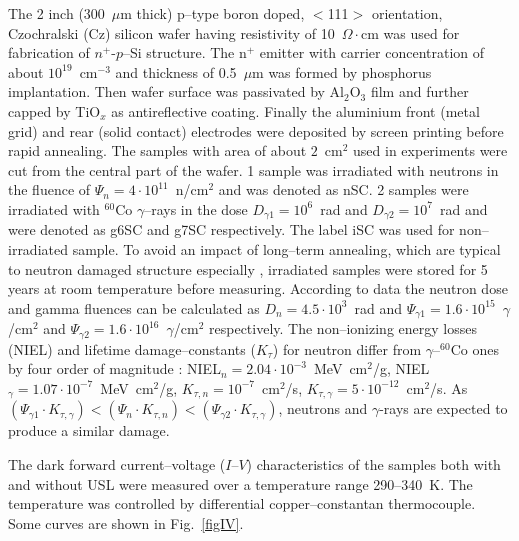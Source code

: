 \documentclass[aip,jap, amsmath,amssymb,reprint]{revtex4-1}
\begin{document}
The 2 inch (300~$\mu$m thick) p--type boron doped, $<$111$>$ orientation, Czochralski (Cz) silicon wafer having resistivity of 10~$\Omega\cdot$cm was used for fabrication of  $n^+$-$p$--Si structure.
The n$^+$ emitter with carrier concentration of about $10^{19}$~cm$^{-3}$ and thickness of 0.5~$\mu$m was formed by phosphorus implantation.
Then wafer surface was passivated by Al$_2$O$_3$ film and further capped by TiO$_x$ as antireflective coating.
Finally the aluminium front (metal grid) and rear (solid contact) electrodes were deposited by screen printing before rapid annealing.
The samples with area of about $2$~cm$^{2}$ used in experiments were cut from the central part of the wafer.
1 sample  was  irradiated  with  neutrons  in  the fluence  of $\Psi_n=4\cdot10^{11}$~n/cm$^2$  and was denoted as nSC.
2 samples were irradiated  with  $^{60}$Co $\gamma$--rays in the  dose  $D_{\gamma1}=10^6$~rad and $D_{\gamma2}=10^7$~rad and were denoted as g6SC and g7SC respectively.
The label iSC was used for non--irradiated sample.
To avoid an impact of  long--term annealing, which are typical to neutron damaged structure especially \cite{NIEL:Moll,Rew:Srour}, irradiated samples were stored  for  5 years  at  room  temperature before measuring.
According to data \cite{NIEL:Akkerman,Brauning} the neutron dose and gamma fluences can be calculated as $D_n=4.5\cdot10^3$~rad and $\Psi_{\gamma1}=1.6\cdot10^{15}$~$\gamma$/cm$^2$ and $\Psi_{\gamma2}=1.6\cdot10^{16}$~$\gamma$/cm$^2$ respectively.
The non--ionizing energy losses (NIEL) and lifetime damage--constants ($K_\tau$) for neutron
differ from $\gamma$--$^{60}$Co ones by four order of magnitude \cite{NIEL:Akkerman,NIEL:Jafari}:
NIEL$_n=2.04\cdot10^{-3}$~MeV~cm$^2$/g, NIEL$_\gamma=1.07\cdot10^{-7}$~MeV~cm$^2$/g, $K_{\tau,n}=10^{-7}$~cm$^2$/s, $K_{\tau,\gamma}=5\cdot10^{-12}$~cm$^2$/s.
As $(\Psi_{\gamma1}\cdot K_{\tau,\gamma})<(\Psi_{n}\cdot K_{\tau,n})<(\Psi_{\gamma2}\cdot K_{\tau,\gamma})$,
neutrons and $\gamma$-rays are expected to produce a similar damage.


The dark forward current--voltage ($I$--$V$) characteristics of the samples both with and without USL were measured over a temperature range 290--340~K.
The temperature was controlled by differential copper--constantan thermocouple.
Some curves are shown in Fig.~\ref{figIV}.
\end{document}
